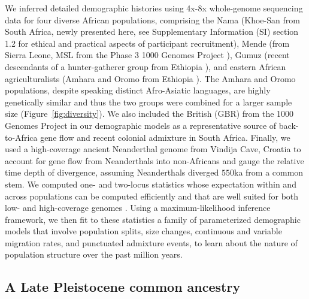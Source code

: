 \documentclass[]{article}
\begin{document}
We inferred detailed demographic histories using 4x-8x whole-genome sequencing
data for four diverse African populations, comprising the Nama (Khoe-San from
South Africa, newly presented here, see Supplementary Information (SI) section
1.2 for ethical and practical aspects of participant recruitment), Mende (from
Sierra Leone, MSL from the Phase 3 1000 Genomes Project
\citep{1000_Genomes_Project_Consortium2015-zq}), Gumuz (recent descendants of a
hunter-gatherer group from Ethiopia \citep{Gurdasani2015-qy,Gopalan2022-pw}),
and eastern African agriculturalists (Amhara and Oromo from Ethiopia
\citep{Gurdasani2015-qy}). The Amhara and Oromo populations, despite speaking
distinct Afro-Asiatic languages, are highly genetically similar
\citep{Pagani2015-pz,Gopalan2022-pw} and thus the two groups were combined for
a larger sample size (Figure~\ref{fig:diversity}). We also included the British
(GBR) from the 1000 Genomes Project in our demographic models as a
representative source of back-to-Africa gene flow and recent colonial admixture
in South Africa. Finally, we used a high-coverage ancient Neanderthal genome
from Vindija Cave, Croatia \citep{Prufer2017-kk} to account for gene flow from
Neanderthals into non-Africans and gauge the relative time depth of divergence,
assuming Neanderthals diverged $550$ka from a common stem. We computed one- and
two-locus statistics whose expectation within and across populations can be
computed efficiently and that are well suited for both low- and high-coverage
genomes \citep{Ragsdale2019-nt,Ragsdale2020-nz}. Using a maximum-likelihood
inference framework, we then fit to these statistics a family of parameterized
demographic models that involve population splits, size changes, continuous and
variable migration rates, and punctuated admixture events, to learn about the
nature of population structure over the past million years.

  
\subsection*{A Late Pleistocene common ancestry}
\end{document}
